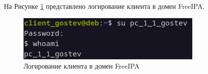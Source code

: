 \documentclass[14pt, a4paper]{extarticle}
\numberwithin{equation}{section}
\begin{document}
На Рисунке \ref{fig:ipa_client_logging} представлено логирование клиента в домен FreeIPA.
\begin{figure}[H]
        \centering
        \includegraphics[scale=1.5]{services/freeipa/client_logging.png}
        \caption{Логирование клиента в домен FreeIPA}
        \label{fig:ipa_client_logging}
\end{figure}





\begingroup
\let\itshape\upshape
\sloppy
\printbibliography[title=список используемых источников]
\endgroup
\end{document}
